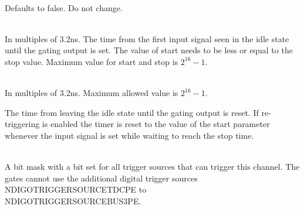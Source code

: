             \\
            Defaults to false. Do not change.\par

            \\
            In multiples of 3.2ns. The time from the first input signal seen in the idle state until the gating output is set. The value of start needs to be less or equal to the stop value. Maximum value for start and stop is $2^{16}-1$.\par

            \\
            In multiples of 3.2ns. Maximum allowed value is $2^{16}-1$.\par

            The time from leaving the idle state until the gating output is reset. If re-triggering is enabled the timer is reset to the value of the start parameter whenever the input signal is set while waiting to reach the stop time.\par

            \\
            A bit mask with a bit set for all trigger sources that can trigger this channel. The gates cannot use the additional digital trigger sources \textsf{NDIGO\tu TRIGGER\tu SOURCE\tu TDC\tu PE} to\\ \textsf{NDIGO\tu TRIGGER\tu SOURCE\tu BUS3\tu PE}.\par

